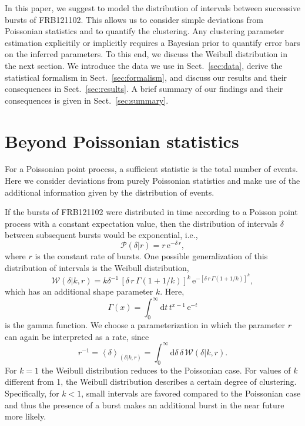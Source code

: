 \documentclass[fleqn,usenatbib]{mnras}
\newcommand{\new}[1]{#1}
\renewcommand{\d}{\delta}
\begin{document}
In this paper, we suggest to model the distribution of intervals between successive bursts of FRB121102. This allows us to consider simple deviations from Poissonian statistics and to quantify the clustering.  Any clustering parameter estimation explicitily or implicitly requires a Bayesian prior to quantify error bars on the inferred parameters.
To this end, we discuss the Weibull distribution in the next section. We introduce the data we use in Sect.~\ref{sec:data}, derive the statistical formalism in Sect.~\ref{sec:formalism}, and discuss our results and their consequences in Sect.~\ref{sec:results}. \new{A brief summary of our findings and their consequences is given in Sect.~\ref{sec:summary}.}


\section{Beyond Poissonian statistics}
\label{sec:weibull}

For a Poissonian point process, a sufficient statistic is the total number of events. Here we consider deviations from purely Poissonian statistics and make use of the additional information given by the distribution of events.

If the bursts of FRB121102 were distributed in time according to a Poisson point process with a constant expectation value, then the distribution of intervals $\d$ between subsequent bursts would be exponential, i.e.,
\begin{equation}
	\mathcal{P}(\d|r) = r\,\mathrm{e}^{-\d\,r},
\end{equation}
where $r$ is the constant rate of bursts. One possible generalization of this distribution of intervals is the Weibull distribution,
\begin{equation}
	\label{eq:weibull}
	\mathcal{W}(\d|k,r) = k\d^{-1} \, \left[\d \, r\, \Gamma\left(1 + 1/k\right)\right]^k \, \mathrm{e}^{-\left[\d \, r \, \Gamma\left(1 + 1/k\right)\right]^k},
\end{equation}
which has an additional shape parameter $k$. Here,
\begin{equation}
	\Gamma(x) = \int_0^\infty \mathrm{d}t \, t^{x - 1} \, \mathrm{e}^{-t}
\end{equation}
is the gamma function. We choose a parameterization in which the parameter $r$ can again be interpreted as a rate, since
\begin{equation}
	r^{-1} = \left<\d\right>_{(\d|k,r)} = \int_0^\infty \mathrm{d}\d \, \d \, \mathcal{W}(\d|k,r).
\end{equation}
For $k=1$ the Weibull distribution reduces to the Poissonian case. For values of $k$ different from 1, the Weibull distribution describes a certain degree of clustering. Specifically, for $k < 1$, small intervals are favored compared to the Poissonian case and thus the presence of a burst makes an additional burst in the near future more likely.
\end{document}
